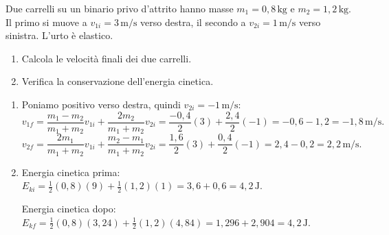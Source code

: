 \begin{question}[ID=2.2, subtitle={Urto elastico tra due carrelli su binario}, tags={urti elastici, sistema isolato}, difficulty=media]
Due carrelli su un binario privo d'attrito hanno masse \(m_1 = 0{,}8 \, \text{kg}\) e \(m_2 = 1{,}2 \, \text{kg}\). Il primo si muove a \(v_{1i} = 3 \, \text{m/s}\) verso destra, il secondo a \(v_{2i} = 1 \, \text{m/s}\) verso sinistra. L'urto è elastico.
\begin{enumerate}
    \item Calcola le velocità finali dei due carrelli.
    \item Verifica la conservazione dell'energia cinetica.
\end{enumerate}
\begin{solution}
    \begin{enumerate}
        \item Poniamo positivo verso destra, quindi \(v_{2i} = -1 \, \text{m/s}\):
        \[
            v_{1f} = \frac{m_1 - m_2}{m_1+m_2}v_{1i} + \frac{2m_2}{m_1+m_2}v_{2i}
            = \frac{-0{,}4}{2}(3) + \frac{2{,}4}{2}(-1) = -0{,}6 - 1{,}2 = -1{,}8 \, \text{m/s}.
        \]
        \[
            v_{2f} = \frac{2m_1}{m_1+m_2}v_{1i} + \frac{m_2-m_1}{m_1+m_2}v_{2i}
            = \frac{1{,}6}{2}(3) + \frac{0{,}4}{2}(-1) = 2{,}4 - 0{,}2 = 2{,}2 \, \text{m/s}.
        \]
        \item Energia cinetica prima: \(E_{ki} = \tfrac{1}{2}(0{,}8)(9) + \tfrac{1}{2}(1{,}2)(1) = 3{,}6 + 0{,}6 = 4{,}2 \, \text{J}\).

        Energia cinetica dopo: \(E_{kf} = \tfrac{1}{2}(0{,}8)(3{,}24) + \tfrac{1}{2}(1{,}2)(4{,}84) = 1{,}296 + 2{,}904 = 4{,}2 \, \text{J}\). \checkmark
    \end{enumerate}
\end{solution}
\end{question}



